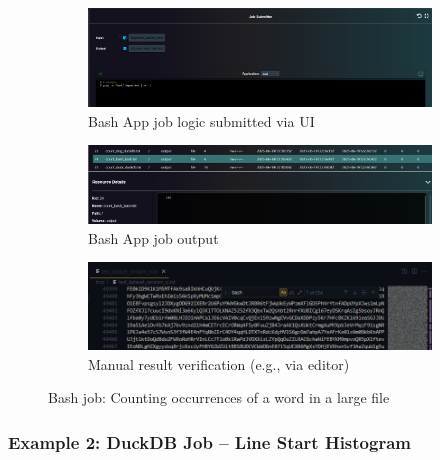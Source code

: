 \begin{figure}[!htbp]
    \centering
    \begin{subfigure}[b]{0.9\textwidth}
        \includegraphics[width=\textwidth]{Images/bash_count_example.txt.png}
        \caption{Bash App job logic submitted via UI}
        \label{fig:examplebash1.1}
    \end{subfigure}

    \vspace{1em}

    \begin{subfigure}[b]{0.9\textwidth}
        \includegraphics[width=\textwidth]{Images/bash_count_result.png}
        \caption{Bash App job output}
        \label{fig:examplebash1.2}
    \end{subfigure}

    \vspace{1em}

    \begin{subfigure}[b]{0.9\textwidth}
        \includegraphics[width=\textwidth]{Images/bash_count.txt.png}
        \caption{Manual result verification (e.g., via editor)}
        \label{fig:examplebash1.3}
    \end{subfigure}
    \caption{Bash job: Counting occurrences of a word in a large file}
\end{figure}

\newpage
\subsubsection*{Example 2: DuckDB Job – Line Start Histogram}

